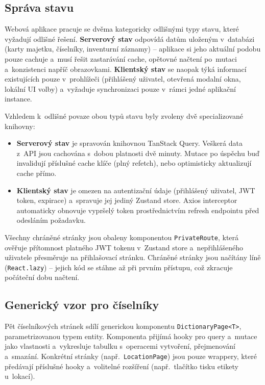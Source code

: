 \subsection{Správa stavu}

Webová aplikace pracuje se dvěma kategoricky odlišnými typy stavu, které vyžadují odlišné řešení. \textbf{Serverový stav} odpovídá datům uloženým v~databázi (karty majetku, číselníky, inventurní záznamy) -- aplikace si jeho aktuální podobu pouze cachuje a~musí řešit zastarávání cache, opětovné načtení po~mutaci a~konzistenci napříč obrazovkami. \textbf{Klientský stav} se naopak týká informací existujících pouze v~prohlížeči (přihlášený uživatel, otevřená modalní okna, lokální UI volby) a~vyžaduje synchronizaci pouze v~rámci jedné aplikační instance.

Vzhledem k~odlišné povaze obou typů stavu byly zvoleny dvě specializované knihovny:

\begin{itemize}
	\item \textbf{Serverový stav} je spravován knihovnou TanStack Query. Veškerá data z~API jsou cachována s~dobou platnosti dvě minuty. Mutace po úspěchu buď invalidují příslušné cache klíče (plný refetch), nebo optimisticky aktualizují cache přímo.
	\item \textbf{Klientský stav} je omezen na autentizační údaje (přihlášený uživatel, JWT token, expirace) a~spravuje jej jediný Zustand store. Axios interceptor automaticky obnovuje vypršelý token prostřednictvím refresh endpointu před odesláním požadavku.
\end{itemize}

Všechny chráněné stránky jsou obaleny komponentou \texttt{PrivateRoute}, která ověřuje přítomnost platného JWT tokenu v~Zustand store a~nepřihlášeného uživatele přesměruje na přihlašovací stránku. Chráněné stránky jsou načítány líně (\texttt{React.lazy}) -- jejich kód se stáhne až při prvním přístupu, což zkracuje počáteční dobu načtení.

\subsection{Generický vzor pro číselníky}

Pět číselníkových stránek sdílí generickou komponentu \texttt{DictionaryPage<T>}, parametrizovanou typem entity. Komponenta přijímá hooky pro query a~mutace jako vlastnosti a~vykresluje tabulku s~operacemi vytvoření, přejmenování a~smazání. Konkrétní stránky (např.\ \texttt{LocationPage}) jsou pouze wrappery, které předávají příslušné hooky a~volitelné rozšíření (např.\ tlačítko tisku etikety u~lokací).

